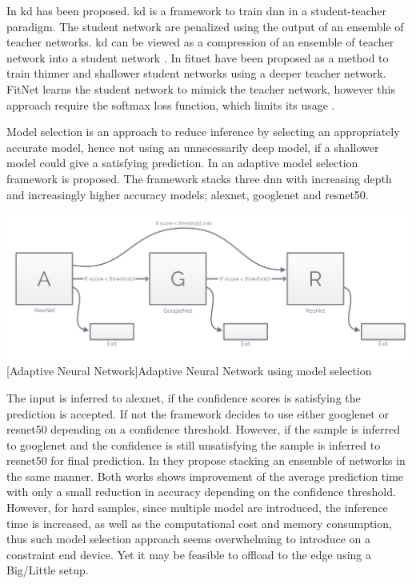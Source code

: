 \begin{enumdescript}
	In \cite{hinton_distilling_2015} \gls{kd} has been proposed. \gls{kd} is a framework to train \gls{dnn} in a student-teacher paradigm. The student network are penalized using the output of an ensemble of teacher networks. \gls{kd} can be viewed as a compression of an ensemble of teacher network into a student network \cite{cheng_survey_2017}. 
	In \cite{romero_fitnets:_2014} \gls{fitnet} have been proposed as a method to train thinner and shallower student networks using a deeper teacher network. FitNet learns the student network to mimick the teacher network, however this approach require the softmax loss function, which limits its usage \cite{cheng_survey_2017}.  
	
	\item[Model Selection] Model selection is an approach to reduce inference by selecting an appropriately accurate model, hence not using an unnecessarily deep model, if a shallower model could give a satisfying prediction. In \cite{bolukbasi_adaptive_2017} an adaptive model selection framework is proposed. The framework stacks three \gls{dnn} with increasing depth and increasingly higher accuracy models; \gls{alexnet}, \gls{googlenet} and \gls{resnet}50. 

	\begin{minipage}[t]{\linewidth}
		\centering                           
		\includegraphics[width=.8\linewidth]{figures/models/adaptive}
		[Adaptive Neural Network]{Adaptive Neural Network using model selection}
	\end{minipage}
	
	The input is inferred to \gls{alexnet}, if the confidence scores is satisfying the prediction is accepted. If not the framework decides to use either \gls{googlenet} or \gls{resnet}50 depending on a confidence threshold. However, if the sample is inferred to \gls{googlenet} and the confidence is still unsatisfying the sample is inferred to \gls{resnet}50 for final prediction. In \cite{tann_flexible_2018} they propose stacking an ensemble of networks in the same manner. Both works shows improvement of the average prediction time with only a small reduction in accuracy depending on the confidence threshold. However, for hard samples, since multiple model are introduced, the inference time is increased, as well as the computational cost and memory consumption, thus such model selection approach seems overwhelming to introduce on a constraint end device. Yet it may be feasible to offload to the edge using a Big/Little setup.
	

\end{enumdescript}
